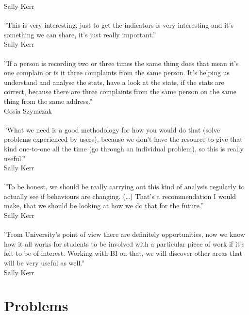 Sally Kerr\\\\
''This is very interesting, just to get the indicators is very interesting and it's something we can share, it's just really important.''\\
Sally Kerr\\\\
''If a person is recording two or three times the same thing does that mean it's one complain or is it three complaints from the same person. It's helping us understand and analyse the stats, have a look at the stats, if the stats are correct, because there are three complaints from the same person on the same thing from the same address.''\\
Gosia Szymczak\\\\
''What we need is a good methodology for how you would do that (solve problems experienced by users), because we don't have the resource to give that kind one-to-one all the time (go through an individual problem), so this is really useful.''\\
Sally Kerr\\\\
''To be honest, we should be really carrying out this kind of analysis regularly to actually see if behaviours are changing. (…) That's a recommendation I would make, that we should be looking at how we do that for the future.''\\
Sally Kerr\\\\
''From University's point of view there are definitely opportunities, now we know how it all works for students to be involved with a particular piece of work if it's felt to be of interest. Working with BI on that, we will discover other areas that will be very useful as well.''\\
Sally Kerr\\

	\section{Problems}
	
